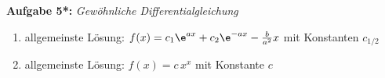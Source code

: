 \vspace{1cm}
%
\textbf{Aufgabe 5*: } \emph{Gewöhnliche Differentialgleichung}
\begin{enumerate}[label=(\alph*)]
\item allgemeinste Lösung: $f(x)=c_1\e^{ax}+c_2\e^{-ax}-\frac{b}{a^2}x$ mit Konstanten $c_{1/2}$
\item allgemeinste Lösung: $f(x)=c\,x^x$ mit Konstante $c$ 
\end{enumerate}
%
%